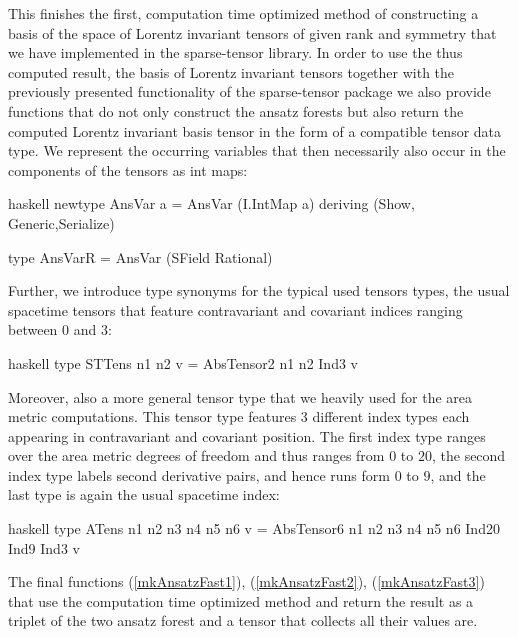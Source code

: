 This finishes the first, computation time optimized method of constructing a basis of the space of Lorentz invariant tensors of given rank and symmetry that we have implemented in the sparse-tensor library. In order to use the thus computed result, the basis of Lorentz invariant tensors together with the previously presented functionality of the sparse-tensor package we also provide functions that do not only construct the ansatz forests but also return the computed Lorentz invariant basis tensor in the form of a compatible tensor data type. We represent the occurring variables that then necessarily also occur in the components of the tensors as int maps:
\begin{center}
\begin{cminted}{haskell}
newtype AnsVar a = AnsVar (I.IntMap a) deriving (Show, Generic,Serialize)

type AnsVarR = AnsVar (SField Rational)
\end{cminted}
\end{center}
Further, we introduce type synonyms for the typical used tensors types, the usual spacetime tensors that feature contravariant and covariant indices ranging between $0$ and $3$:
\begin{center}
\begin{cminted}{haskell}
type STTens n1 n2 v = AbsTensor2 n1 n2 Ind3 v
\end{cminted}
\end{center}
Moreover, also a more general tensor type that we heavily used for the area metric computations. This tensor type features 3 different index types each appearing in contravariant and covariant position. The first index type ranges over the area metric degrees of freedom and thus ranges from $0$ to $20$, the second index type labels second derivative pairs, and hence runs form $0$ to $9$, and the last type is again the usual spacetime index:
\begin{center}
\begin{cminted}{haskell}
type ATens n1 n2 n3 n4 n5 n6 v = 
     AbsTensor6 n1 n2 n3 n4 n5 n6 Ind20 Ind9 Ind3 v
\end{cminted}
\end{center}
The final functions (\ref{mkAnsatzFast1}), (\ref{mkAnsatzFast2}), (\ref{mkAnsatzFast3}) that use the computation time optimized method and return the result as a triplet of the two ansatz forest and a tensor that collects all their values are.

